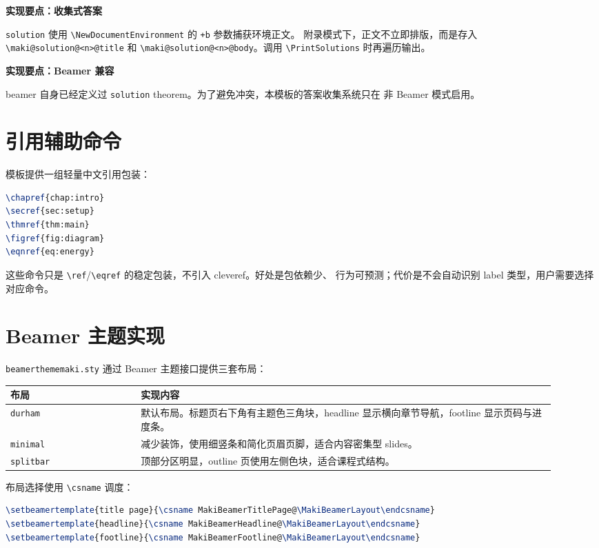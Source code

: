 \documentclass[a4paper,11pt]{ltxdoc}
\newcommand{\mfile}[1]{\texttt{#1}}
\newcommand{\mcls}[1]{\textsf{#1}}
\newcommand{\mpkg}[1]{\textsf{#1}}
\newcommand{\mopt}[1]{\texttt{#1}}
\newcommand{\menv}[1]{\texttt{#1}}
\newcommand{\mcmd}[1]{\texttt{\textbackslash#1}}
\newenvironment{implementation}[1]
  {\par\medskip\noindent\textbf{\color{MakiBlue}实现要点：#1}\par\smallskip}
  {\par\medskip}
\begin{document}
\begin{implementation}{收集式答案}
\menv{solution} 使用 \mcmd{NewDocumentEnvironment} 的 \verb|+b| 参数捕获环境正文。
附录模式下，正文不立即排版，而是存入
\verb|\maki@solution@<n>@title| 和 \verb|\maki@solution@<n>@body|。调用
\mcmd{PrintSolutions} 时再遍历输出。
\end{implementation}

\begin{implementation}{Beamer 兼容}
\mcls{beamer} 自身已经定义过 \menv{solution} theorem。为了避免冲突，本模板的答案收集系统只在
非 Beamer 模式启用。
\end{implementation}

\section{引用辅助命令}

模板提供一组轻量中文引用包装：

\begin{lstlisting}[language=TeX]
\chapref{chap:intro}
\secref{sec:setup}
\thmref{thm:main}
\figref{fig:diagram}
\eqnref{eq:energy}
\end{lstlisting}

这些命令只是 \mcmd{ref}/\mcmd{eqref} 的稳定包装，不引入 \mpkg{cleveref}。好处是包依赖少、
行为可预测；代价是不会自动识别 label 类型，用户需要选择对应命令。

\section{Beamer 主题实现}

\mfile{beamerthememaki.sty} 通过 Beamer 主题接口提供三套布局：

\begin{longtable}{@{}p{0.22\linewidth}p{0.7\linewidth}@{}}
\toprule
布局 & 实现内容 \\
\midrule
\mopt{durham} & 默认布局。标题页右下角有主题色三角块，headline 显示横向章节导航，footline 显示页码与进度条。\\
\mopt{minimal} & 减少装饰，使用细竖条和简化页眉页脚，适合内容密集型 slides。\\
\mopt{splitbar} & 顶部分区明显，outline 页使用左侧色块，适合课程式结构。\\
\bottomrule
\end{longtable}

布局选择使用 \mcmd{csname} 调度：

\begin{lstlisting}[language=TeX]
\setbeamertemplate{title page}{\csname MakiBeamerTitlePage@\MakiBeamerLayout\endcsname}
\setbeamertemplate{headline}{\csname MakiBeamerHeadline@\MakiBeamerLayout\endcsname}
\setbeamertemplate{footline}{\csname MakiBeamerFootline@\MakiBeamerLayout\endcsname}
\end{lstlisting}
\end{document}
